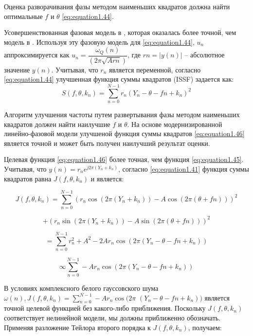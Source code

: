 Оценка разворачивания фазы методом наименьших квадратов должна найти оптимальные $f$ и $\theta$ \ref{eq:equation1.44}.

Усовершенствованная фазовая модель в \cite{6408166}, которая оказалась более точной, чем модель в \cite{1057115}. 
Используя эту фазовую модель для \ref{eq:equation1.44}, $u_n$ аппроксимируется как $u_n = \dfrac{\omega_Q(n)}{(2 \pi \sqrt{Arn})}$, где $rn = | y (n) |$ -- абсолютное значение $y(n)$. Учитывая, что $r_n$ является переменной, согласно \ref{eq:equation1.44}  улучшенная функция суммы квадратов (ISSF) задается как:
\begin{equation}
	\label{eq:equation1.46}	
	S(f, \theta, k_n) = \sum_{n=0}^{N-1} r_n (Y_n- \theta -fn +k_n)^2
\end{equation}

Алгоритм улучшения частоты путем развертывания фазы методом наименьших квадратов должен найти наилучшие $f$ и $\theta$. На основе модернизированной линейно-фазовой модели улучшеной функция суммы квадратов \ref{eq:equation1.46} является точной и может быть получен наилучший результат оценки.

Целевая функция \ref{eq:equation1.46} более точная, чем функция \ref{eq:equation1.45}. Учитывая, что $y(n) = r_ne^{ j2\pi (Y_n + k_n)}$, согласно \ref{eq:equation1.41} функция суммы квадратов равна $J(f, \theta, k_n)$ и является:

$$
J (f, \theta, k_n) = \sum_{n=0}^{N-1} (r_n \cos(2 \pi (Y_n+k_n)) -A\cos(2 \pi(\theta+fn)))^2
$$

\begin{equation}
	\label{eq:equation1.47}		
	+(r_n \sin(2\pi(Y_n+k_n))-A\sin(2\pi(\theta+fn)))^2 
\end{equation}

$$ = \sum_{n=0}^{N-1} r_n^2+A^2-2Ar_n\cos(2\pi(Y_n-\theta-fn+k_n))$$

$$ \infty \sum_{n=0}^{N-1} -Ar_n\cos(2\pi(Y_n-\theta-fn+k_n))$$

В условиях комплексного белого гауссовского шума $\omega (n), J(f, \theta, k_n) = \sum_{n=0}^{N-1}-Ar_n\cos(2\pi$
$(Y_n-\theta-fn+k_n))$ 
является точной целевой функцией без какого-либо приближения. Поскольку $J(f, \theta, k_n)$ соответствует нелинейной модели, мы должны приближенно обозначать. Применяя разложение Тейлора второго порядка к $J(f, \theta, k_n)$, получаем:

